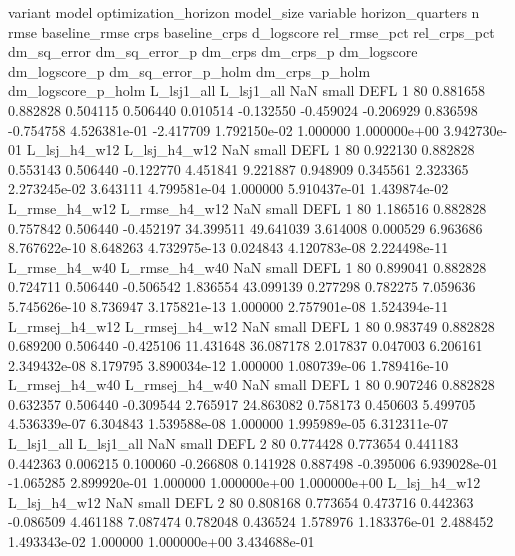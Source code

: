        variant          model  optimization_horizon model_size variable  horizon_quarters  n     rmse  baseline_rmse     crps  baseline_crps  d_logscore  rel_rmse_pct  rel_crps_pct  dm_sq_error  dm_sq_error_p   dm_crps    dm_crps_p  dm_logscore  dm_logscore_p  dm_sq_error_p_holm  dm_crps_p_holm  dm_logscore_p_holm
    L_lsj1_all     L_lsj1_all                   NaN      small     DEFL                 1 80 0.881658       0.882828 0.504115       0.506440    0.010514     -0.132550     -0.459024    -0.206929       0.836598 -0.754758 4.526381e-01    -2.417709   1.792150e-02            1.000000    1.000000e+00        3.942730e-01
  L_lsj_h4_w12   L_lsj_h4_w12                   NaN      small     DEFL                 1 80 0.922130       0.882828 0.553143       0.506440   -0.122770      4.451841      9.221887     0.948909       0.345561  2.323365 2.273245e-02     3.643111   4.799581e-04            1.000000    5.910437e-01        1.439874e-02
 L_rmse_h4_w12  L_rmse_h4_w12                   NaN      small     DEFL                 1 80 1.186516       0.882828 0.757842       0.506440   -0.452197     34.399511     49.641039     3.614008       0.000529  6.963686 8.767622e-10     8.648263   4.732975e-13            0.024843    4.120783e-08        2.224498e-11
 L_rmse_h4_w40  L_rmse_h4_w40                   NaN      small     DEFL                 1 80 0.899041       0.882828 0.724711       0.506440   -0.506542      1.836554     43.099139     0.277298       0.782275  7.059636 5.745626e-10     8.736947   3.175821e-13            1.000000    2.757901e-08        1.524394e-11
L_rmsej_h4_w12 L_rmsej_h4_w12                   NaN      small     DEFL                 1 80 0.983749       0.882828 0.689200       0.506440   -0.425106     11.431648     36.087178     2.017837       0.047003  6.206161 2.349432e-08     8.179795   3.890034e-12            1.000000    1.080739e-06        1.789416e-10
L_rmsej_h4_w40 L_rmsej_h4_w40                   NaN      small     DEFL                 1 80 0.907246       0.882828 0.632357       0.506440   -0.309544      2.765917     24.863082     0.758173       0.450603  5.499705 4.536339e-07     6.304843   1.539588e-08            1.000000    1.995989e-05        6.312311e-07
    L_lsj1_all     L_lsj1_all                   NaN      small     DEFL                 2 80 0.774428       0.773654 0.441183       0.442363    0.006215      0.100060     -0.266808     0.141928       0.887498 -0.395006 6.939028e-01    -1.065285   2.899920e-01            1.000000    1.000000e+00        1.000000e+00
  L_lsj_h4_w12   L_lsj_h4_w12                   NaN      small     DEFL                 2 80 0.808168       0.773654 0.473716       0.442363   -0.086509      4.461188      7.087474     0.782048       0.436524  1.578976 1.183376e-01     2.488452   1.493343e-02            1.000000    1.000000e+00        3.434688e-01
